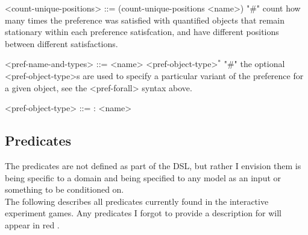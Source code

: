\documentclass{article}
\begin{document}
\begin{grammar}
<count-unique-positions> ::= (count-unique-positions <name>) "#" count how many times the preference was satisfied with quantified objects that remain stationary within each preference satisfcation, and have different positions between different satisfactions.

<pref-name-and-types> ::= <name> <pref-object-type>$^*$ "#" the optional <pref-object-type>s are used to specify a particular variant of the preference for a given object, see the <pref-forall> syntax above.

    <pref-object-type> ::= : <name>
    



\end{grammar}



\subsection{Predicates}
The predicates are not defined as part of the DSL, but rather I envision them is being specific to a domain and being specified to any model as an input or something to be conditioned on. \\
            
            The following describes all predicates currently found in the interactive experiment games. Any predicates I forgot to provide a description for will appear in { \color{red} red }.
        
\end{document}
